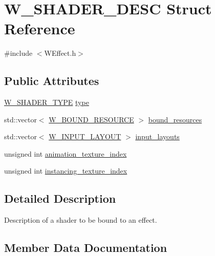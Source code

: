\hypertarget{struct_w___s_h_a_d_e_r___d_e_s_c}{}\section{W\+\_\+\+S\+H\+A\+D\+E\+R\+\_\+\+D\+E\+SC Struct Reference}
\label{struct_w___s_h_a_d_e_r___d_e_s_c}


{\ttfamily \#include $<$W\+Effect.\+h$>$}

\subsection*{Public Attributes}
\begin{DoxyCompactItemize}
\item 
\hyperlink{group__engineclass_ga8a79e4a3a441c88450e176150102c7b7}{W\+\_\+\+S\+H\+A\+D\+E\+R\+\_\+\+T\+Y\+PE} \hyperlink{struct_w___s_h_a_d_e_r___d_e_s_c_ad7b83db0ce3b5eb747a0fea76b52acd5}{type}
\item 
std\+::vector$<$ \hyperlink{struct_w___b_o_u_n_d___r_e_s_o_u_r_c_e}{W\+\_\+\+B\+O\+U\+N\+D\+\_\+\+R\+E\+S\+O\+U\+R\+CE} $>$ \hyperlink{struct_w___s_h_a_d_e_r___d_e_s_c_aa3fea1cc775493c0fe9590129f91df63}{bound\+\_\+resources}
\item 
std\+::vector$<$ \hyperlink{struct_w___i_n_p_u_t___l_a_y_o_u_t}{W\+\_\+\+I\+N\+P\+U\+T\+\_\+\+L\+A\+Y\+O\+UT} $>$ \hyperlink{struct_w___s_h_a_d_e_r___d_e_s_c_a994385c2ccd44ff6b0879ac15ba035cd}{input\+\_\+layouts}
\item 
unsigned int \hyperlink{struct_w___s_h_a_d_e_r___d_e_s_c_ac1b40ff1facba393210a61aeb5a064ea}{animation\+\_\+texture\+\_\+index}
\item 
unsigned int \hyperlink{struct_w___s_h_a_d_e_r___d_e_s_c_a23a05bd7613ca8b029f14e27130a7844}{instancing\+\_\+texture\+\_\+index}
\end{DoxyCompactItemize}


\subsection{Detailed Description}
Description of a shader to be bound to an effect. 

\subsection{Member Data Documentation}
